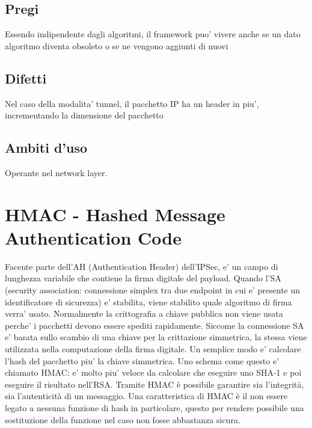\subsection{Pregi}
Essendo indipendente dagli algoritmi, il framework puo' vivere anche se un dato algoritmo diventa obsoleto o se ne vengono aggiunti di nuovi
\subsection{Difetti}
Nel caso della modalita' tunnel, il pacchetto IP ha un header in piu', incrementando la dimensione del pacchetto
\subsection{Ambiti d'uso}
Operante nel network layer.
\section{HMAC - Hashed Message Authentication Code}
Facente parte dell'AH (Authentication Header) dell'IPSec, e' un campo di lunghezza variabile che contiene la firma digitale del payload. Quando l'SA (security association: connessione simplex tra due endpoint in cui e' presente un identificatore di sicurezza) e' stabilita, viene stabilito quale algoritmo di firma verra' usato. Normalmente la crittografia a chiave pubblica non viene usata perche' i pacchetti devono essere spediti rapidamente. Siccome la connessione SA e' basata sullo scambio di una chiave per la crittazione simmetrica, la stessa viene utilizzata nella computazione della firma digitale. Un semplice modo e' calcolare l'hash del pacchetto piu' la chiave simmetrica. Uno schema come questo e' chiamato HMAC:  e' molto piu' veloce da calcolare che eseguire uno SHA-1 e poi eseguire il risultato nell'RSA. Tramite HMAC è possibile garantire sia l'integrità, sia l'autenticità di un messaggio. Una caratteristica di HMAC è il non essere legato a nessuna funzione di hash in particolare, questo per rendere possibile una sostituzione della funzione nel caso non fosse abbastanza sicura.